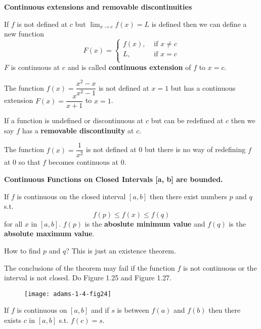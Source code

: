 \documentclass[../main.tex]{subfiles}
\begin{document}
\textbf{Continuous extensions and removable discontinuities}

If $f$ is not defined at $c$ but $\lim_{x \to c} f(x) = L$ is defined then we can define a new function
\[
    F(x) =
    \begin{cases}
        f(x), &\text{ if } x \neq c\\
        L, &\text{ if } x =c\\
    \end{cases}
\]
$F$ is continuous at $c$ and is called \textbf{continuous extension} of $f$ to $x=c$.
\begin{example}
    The function $f(x) = \dfrac{x^2 - x}{x^2 - 1}$ is not defined at $x=1$ but has a continuous extension $F(x) = \dfrac{x}{x+1}$ to $x=1$.
\end{example}

If a function is undefined or discontinuous at $c$ but can be redefined at $c$ then we say $f$ has a \textbf{removable discontinuity} at $c$.

\begin{example}
    The function $f(x) = \dfrac{1}{x^2}$ is not defined at 0 but there is no way of redefining $f$ at 0 so that $f$ becomes continuous at 0.
\end{example}

\textbf{Continuous Functions on Closed Intervals [a, b] are bounded.}
\begin{theorem}
    If $f$ is continuous on the closed interval $[a, b]$ then there exist numbers $p$ and $q$ s.t.
    \[
        f(p) \leq f(x) \leq f(q)
    \]
    for all $x$ in $[a, b]$.
    $f(p)$ is the \textbf{aboslute minimum value} and $f(q)$ is the \textbf{absolute maximum value}.
\end{theorem}
How to find $p$ and $q$? This is just an existence theorem.

\begin{example}
    The conclusions of the theorem may fail if the function $f$ is not continuous or the interval is not closed. Do Figure 1.25 and Figure 1.27.
    \begin{figure}[H]
        \centering
        \texttt{[image: adams-1-4-fig24]}
    \end{figure}
\end{example}

\begin{theorem}
    If $f$ is continuous on $[a, b]$ and if $s$ is between $f(a)$ and $f(b)$ then there exists $c$ in $[a, b]$ s.t. $f(c) = s$.
\end{theorem}
\end{document}
